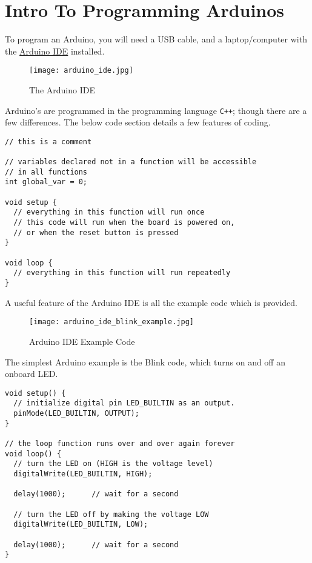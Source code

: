\documentclass[../TinyBot.tex]{subfiles}
\begin{document}
\section{Intro To Programming Arduinos}

To program an Arduino, you will need a USB cable, and a laptop/computer with the \href{https://www.arduino.cc/en/software}{Arduino IDE} installed. 



\begin{figure}[h]
    \centering
    \texttt{[image: arduino\_ide.jpg]}
    \caption{The Arduino IDE}
\end{figure}


Arduino's are programmed in the programming language \lstinline[]!C++!; though there are a few differences. The below code section details a few features of coding.


\begin{lstlisting}
// this is a comment

// variables declared not in a function will be accessible
// in all functions
int global_var = 0;

void setup {
  // everything in this function will run once
  // this code will run when the board is powered on, 
  // or when the reset button is pressed
}

void loop {
  // everything in this function will run repeatedly
}

\end{lstlisting}
\bigskip

\pagebreak
A useful feature of the Arduino IDE is all the example code which is provided.
\begin{figure}
    \centering
    \texttt{[image: arduino\_ide\_blink\_example.jpg]}
    \label{fig:ide-blink}
    \caption{Arduino IDE Example Code}
\end{figure}

The simplest Arduino example is the Blink code, which turns on and off an onboard LED.

\begin{lstlisting}
void setup() {
  // initialize digital pin LED_BUILTIN as an output.
  pinMode(LED_BUILTIN, OUTPUT);
}

// the loop function runs over and over again forever
void loop() {
  // turn the LED on (HIGH is the voltage level)
  digitalWrite(LED_BUILTIN, HIGH); 

  delay(1000);      // wait for a second

  // turn the LED off by making the voltage LOW
  digitalWrite(LED_BUILTIN, LOW);  
  
  delay(1000);      // wait for a second
}
\end{lstlisting}
\end{document}
